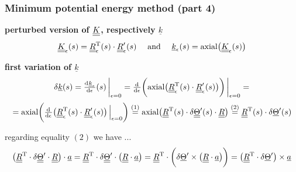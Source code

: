 \begin{frame}
  \frametitle{Minimum potential energy method (part 4)}
  
  \textbf{perturbed version of $\underline{\underline{K}}$, respectively $\underline{k}$}
  \begin{displaymath}
    \underline{\underline{K}}_{\epsilon}(s) =
    \underline{\underline{R}}_{\epsilon}^{\mathrm{T}}(s) \cdot \underline{\underline{R}}_{\epsilon}^{\prime}(s)
    \quad \text{ and } \quad
    \underline{k}_{\epsilon}(s) = \mathrm{axial} \bigl( \underline{\underline{K}}_{\epsilon}(s) \bigr)
  \end{displaymath}
  
  \vspace{0.5em}
  \textbf{first variation of $\underline{k}$}
  \begin{displaymath}
    \delta \underline{k}(s) =
    \od{\underline{k}_{\epsilon}}{\epsilon}(s) \sVert[3]_{\epsilon=0} =
    \od{}{\epsilon} \biggl( \axial \bigl( \doubleunderline{R}_{\epsilon}^{\mathrm{T}}(s) \cdot \doubleunderline{R}_{\epsilon}^{\prime}(s) \bigr) \biggr) \sVert[3]_{\epsilon=0} =
  \end{displaymath}
  \begin{displaymath}
    = \axial \biggl( \od{}{\epsilon} \bigl( \doubleunderline{R}_{\epsilon}^{\mathrm{T}}(s) \cdot \doubleunderline{R}_{\epsilon}^{\prime}(s) \bigr) \sVert[2]_{\epsilon=0} \biggr) \overset{(1)}{=}
    \axial \bigl( \doubleunderline{R}^{\mathrm{T}}(s) \cdot \delta \doubleunderline{\Theta}^{\prime}(s) \cdot \doubleunderline{R} \bigr) \overset{(2)}{=}
    \doubleunderline{R}^{\mathrm{T}}(s) \cdot \delta \underline{\Theta}^{\prime}(s)      
  \end{displaymath}
  
  \vspace{0.5em}
  regarding equality $(2)$ we have ...
  \begin{displaymath}
    \bigl( \underline{\underline{R}}^{\mathrm{T}} \cdot \delta \underline{\underline{\Theta}}^{\prime} \cdot \underline{\underline{R}} \bigr) \cdot \underline{a} =
    \underline{\underline{R}}^{\mathrm{T}} \cdot \delta \underline{\underline{\Theta}}^{\prime} \cdot \bigl( \underline{\underline{R}} \cdot \underline{a} \bigr) =
    \underline{\underline{R}}^{\mathrm{T}} \cdot \biggl( \delta \underline{\Theta}^{\prime} \times \bigl( \underline{\underline{R}} \cdot \underline{a} \bigr) \biggr) =
    \bigl( \underline{\underline{R}}^{\mathrm{T}} \cdot \delta \underline{\Theta}^{\prime} \bigr) \times \underline{a}
  \end{displaymath}
\end{frame}


